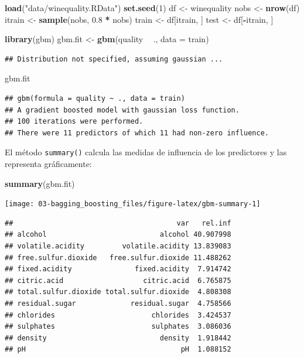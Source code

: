 \documentclass[
  spanish,
]{book}
\newenvironment{Shaded}{\begin{snugshade}}{\end{snugshade}}
\newcommand{\DataTypeTok}[1]{\textcolor[rgb]{0.13,0.29,0.53}{#1}}
\newcommand{\DecValTok}[1]{\textcolor[rgb]{0.00,0.00,0.81}{#1}}
\newcommand{\FloatTok}[1]{\textcolor[rgb]{0.00,0.00,0.81}{#1}}
\newcommand{\KeywordTok}[1]{\textcolor[rgb]{0.13,0.29,0.53}{\textbf{#1}}}
\newcommand{\NormalTok}[1]{#1}
\newcommand{\OperatorTok}[1]{\textcolor[rgb]{0.81,0.36,0.00}{\textbf{#1}}}
\newcommand{\StringTok}[1]{\textcolor[rgb]{0.31,0.60,0.02}{#1}}
\theoremstyle{break}
\theoremstyle{definition}
\theoremstyle{definition}
\theoremstyle{definition}
\theoremstyle{remark}
\begin{document}
\begin{Shaded}
\begin{Highlighting}[]
\KeywordTok{load}\NormalTok{(}\StringTok{"data/winequality.RData"}\NormalTok{)}
\KeywordTok{set.seed}\NormalTok{(}\DecValTok{1}\NormalTok{)}
\NormalTok{df <-}\StringTok{ }\NormalTok{winequality}
\NormalTok{nobs <-}\StringTok{ }\KeywordTok{nrow}\NormalTok{(df)}
\NormalTok{itrain <-}\StringTok{ }\KeywordTok{sample}\NormalTok{(nobs, }\FloatTok{0.8} \OperatorTok{*}\StringTok{ }\NormalTok{nobs)}
\NormalTok{train <-}\StringTok{ }\NormalTok{df[itrain, ]}
\NormalTok{test <-}\StringTok{ }\NormalTok{df[}\OperatorTok{-}\NormalTok{itrain, ]}

\KeywordTok{library}\NormalTok{(gbm)}
\NormalTok{gbm.fit <-}\StringTok{ }\KeywordTok{gbm}\NormalTok{(quality }\OperatorTok{~}\StringTok{ }\NormalTok{., }\DataTypeTok{data =}\NormalTok{ train)}
\end{Highlighting}
\end{Shaded}

\begin{verbatim}
## Distribution not specified, assuming gaussian ...
\end{verbatim}

\begin{Shaded}
\begin{Highlighting}[]
\NormalTok{gbm.fit}
\end{Highlighting}
\end{Shaded}

\begin{verbatim}
## gbm(formula = quality ~ ., data = train)
## A gradient boosted model with gaussian loss function.
## 100 iterations were performed.
## There were 11 predictors of which 11 had non-zero influence.
\end{verbatim}

El método \texttt{summary()} calcula las medidas de influencia de los predictores y las representa gráficamente:

\begin{Shaded}
\begin{Highlighting}[]
\KeywordTok{summary}\NormalTok{(gbm.fit)}
\end{Highlighting}
\end{Shaded}

\begin{center}\texttt{[image: 03-bagging\_boosting\_files/figure-latex/gbm-summary-1]} \end{center}

\begin{verbatim}
##                                       var   rel.inf
## alcohol                           alcohol 40.907998
## volatile.acidity         volatile.acidity 13.839083
## free.sulfur.dioxide   free.sulfur.dioxide 11.488262
## fixed.acidity               fixed.acidity  7.914742
## citric.acid                   citric.acid  6.765875
## total.sulfur.dioxide total.sulfur.dioxide  4.808308
## residual.sugar             residual.sugar  4.758566
## chlorides                       chlorides  3.424537
## sulphates                       sulphates  3.086036
## density                           density  1.918442
## pH                                     pH  1.088152
\end{verbatim}
\end{document}
